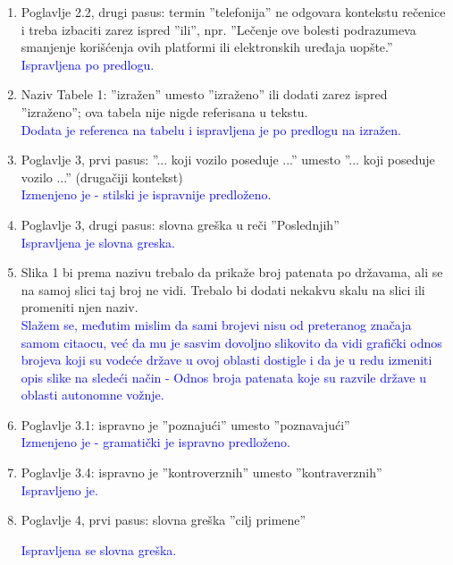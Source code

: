 \documentclass[a4paper]{report}
\newcommand{\odgovor}[1]{\textcolor{blue}{#1}}
\begin{document}
\begin{enumerate}
\item Poglavlje 2.2, drugi pasus: termin ''telefonija'' ne odgovara kontekstu rečenice i treba izbaciti zarez ispred ''ili'', npr. ''Lečenje ove bolesti podrazumeva smanjenje
korišćenja ovih platformi ili elektronskih uređaja uopšte.'' \\
\odgovor{Ispravljena po predlogu.}

\item Naziv Tabele 1: ''izražen'' umesto ''izraženo'' ili dodati zarez ispred ''izraženo''; ova tabela nije nigde referisana u tekstu. \\
\odgovor{Dodata je referenca na tabelu i ispravljena je po predlogu na izražen.}

\item Poglavlje 3, prvi pasus: ''... koji vozilo poseduje ...'' umesto ''... koji poseduje vozilo ...'' (drugačiji kontekst) \\
\odgovor{Izmenjeno je - stilski je ispravnije predloženo.}

\item Poglavlje 3, drugi pasus: slovna greška u reči ''Poslednjih'' \\
\odgovor{Ispravljena je slovna greska.}

\item Slika 1 bi prema nazivu trebalo da prikaže broj patenata po državama, ali se na samoj slici taj broj ne vidi. Trebalo bi dodati nekakvu skalu na slici ili promeniti njen naziv. \\
\odgovor{Slažem se, međutim mislim da sami brojevi nisu od preteranog značaja samom citaocu, već da mu je sasvim dovoljno slikovito da vidi grafički odnos brojeva koji su vodeće države u ovoj oblasti dostigle i da je u redu izmeniti opis slike na sledeći način -  Odnos broja patenata koje su razvile države u oblasti autonomne vožnje.}

\item Poglavlje 3.1: ispravno je ''poznajući'' umesto ''poznavajući'' \\
\odgovor{Izmenjeno je - gramatički je ispravno predloženo.} 

\item Poglavlje 3.4: ispravno je ''kontroverznih'' umesto ''kontraverznih'' \\
\odgovor{Ispravljeno je.}

\item Poglavlje 4, prvi pasus: slovna greška ''cilj primene''

\odgovor{Ispravljena se slovna greška.} 


\end{enumerate}
\end{document}
